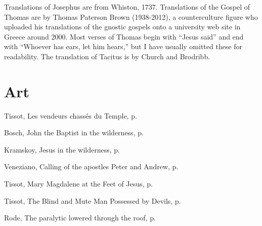 \documentclass[10pt,twoside]{article} %
\newcommand{\artcredit}[3]{#2, #3, p.~\pageref{fig:#1}}
\begin{document}
Translations of Josephus are from Whiston, 1737.
Translations of the Gospel of Thomas are  by Thomas Paterson Brown (1938-2012),
a counterculture figure who uploaded his translations of the gnostic gospels onto a university web site
in Greece around 2000. Most verses of Thomas begin with ``Jesus said''
and end with ``Whoever has ears, let him hears,'' but I have usually omitted these for readability.\label{brown-trans}
The translation of Tacitus is by Church and Brodribb.


\vfill

\vfill\pagebreak\section*{Art}
\artcredit{cleansing-temple}{Tissot}{Les vendeurs chassés du Temple}

\artcredit{john-in-the-wilderness}{Bosch}{John the Baptist in the wilderness}

\artcredit{jesus-in-wilderness}{Kramskoy}{Jesus in the wilderness}

\artcredit{fishers-of-men}{Veneziano}{Calling of the apostles Peter and Andrew}

\artcredit{mary-magdalene-at-the-feet-of-jesus}{Tissot}{Mary Magdalene at the Feet of Jesus}

\artcredit{driving-out-demons}{Tissot}{The Blind and Mute Man Possessed by Devils}

\artcredit{healing-the-paralytic}{Rode}{The paralytic lowered through the roof}
\end{document}
